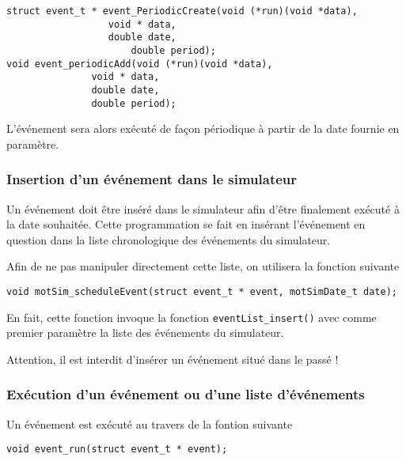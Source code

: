 \begin{verbatim}
struct event_t * event_PeriodicCreate(void (*run)(void *data),
			      void * data,
			      double date,
		              double period);
void event_periodicAdd(void (*run)(void *data),
		       void * data,
		       double date,
		       double period);

\end{verbatim}

   L'événement sera alors exécuté de façon périodique à partir de la
date fournie en paramètre.

%
\subsubsection{Insertion d'un événement dans le simulateur}

   Un événement doit être inséré dans le simulateur afin d'être
finalement exécuté à la date souhaitée. Cette programmation se fait en
insérant l'événement en question dans la liste chronologique des
événements du simulateur.

   Afin de ne pas manipuler directement cette liste, on utilisera la
fonction suivante

\begin{verbatim}
void motSim_scheduleEvent(struct event_t * event, motSimDate_t date);
\end{verbatim}

   En fait, cette fonction invoque la fonction
\lstinline!eventList_insert()! avec comme premier paramètre la liste
des événements du simulateur.

   Attention, il est interdit d'insérer un événement situé dans le
passé !

%
\subsubsection{Exécution d'un événement ou d'une liste d'événements}

   Un  événement est exécuté au travers de la fontion suivante

\begin{verbatim}
void event_run(struct event_t * event);
\end{verbatim}

